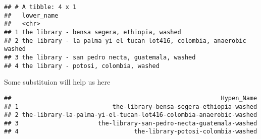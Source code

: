 \documentclass[]{article}
\newenvironment{Shaded}{\begin{snugshade}}{\end{snugshade}}
\newcommand{\DataTypeTok}[1]{\textcolor[rgb]{0.13,0.29,0.53}{#1}}
\newcommand{\DecValTok}[1]{\textcolor[rgb]{0.00,0.00,0.81}{#1}}
\newcommand{\KeywordTok}[1]{\textcolor[rgb]{0.13,0.29,0.53}{\textbf{#1}}}
\newcommand{\NormalTok}[1]{#1}
\newcommand{\OperatorTok}[1]{\textcolor[rgb]{0.81,0.36,0.00}{\textbf{#1}}}
\newcommand{\OtherTok}[1]{\textcolor[rgb]{0.56,0.35,0.01}{#1}}
\newcommand{\StringTok}[1]{\textcolor[rgb]{0.31,0.60,0.02}{#1}}
\begin{document}
\begin{verbatim}
## # A tibble: 4 x 1
##   lower_name                                                           
##   <chr>                                                                
## 1 the library - bensa segera, ethiopia, washed                         
## 2 the library - la palma yi el tucan lot416, colombia, anaerobic washed
## 3 the library - san pedro necta, guatemala, washed                     
## 4 the library - potosi, colombia, washed
\end{verbatim}

Some substituion will help us here

\begin{Shaded}
\end{Shaded}

\begin{verbatim}
##                                                          Hypen_Name
## 1                          the-library-bensa-segera-ethiopia-washed
## 2 the-library-la-palma-yi-el-tucan-lot416-colombia-anaerobic-washed
## 3                      the-library-san-pedro-necta-guatemala-washed
## 4                                the-library-potosi-colombia-washed
\end{verbatim}
\end{document}
